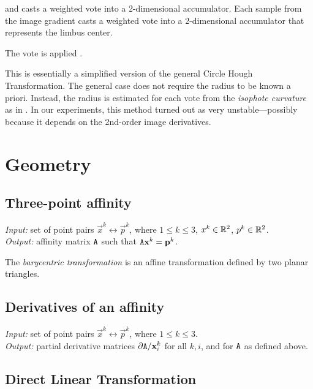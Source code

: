 and casts a weighted vote into a 2-dimensional accumulator.
Each sample from the image gradient casts a weighted vote into a 2-dimensional accumulator that represents the limbus center.

The vote is applied \todo{\dots}.

This is essentially a simplified version of the general Circle Hough Transformation.
The general case does not require the radius to be known a priori.
Instead, the radius is estimated for each vote from the \textit{isophote curvature} as in \cite{valenti08}.
In our experiments, this method turned out as very unstable---possibly because it depends on the 2nd-order image derivatives.

\section{Geometry}

\subsection{Three-point affinity}

\textit{Input:} set of point pairs $\vec x^k \leftrightarrow \vec p^k$, where $1 \leq k \leq 3$, $x^k \in \mathbb{R}^2$, $p^k \in \mathbb{R}^2$.\\
\textit{Output:} affinity matrix $\mathtt{A}$ such that $\mathtt{A} \mathbf{x}^k = \mathbf{p}^k$.\\


The \textit{barycentric transformation} is an affine transformation defined by two planar triangles.

\subsection{Derivatives of an affinity}
\label{s:daffine}

\textit{Input:} set of point pairs $\vec x^k \leftrightarrow \vec p^k$, where $1 \leq k \leq 3$.\\
\textit{Output:} partial derivative matrices $\partial \mathtt{A} / \mathbf{x}^k_i$ for all $k, i$, and for $\mathtt{A}$ as defined above.\\


\subsection{Direct Linear Transformation}

